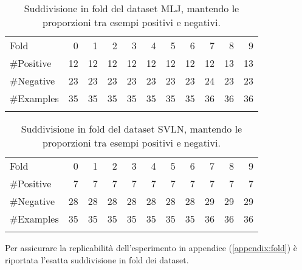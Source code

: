 \begin{table}[h!tbp]
	\centering
		\begin{tabular}{l@{\qquad}*{10}{r}}
		\toprule
\addlinespace
			Fold &  0 &  1 &  2 &  3 &  4 &  5 &  6 &  7 &  8 &  9 \\
\addlinespace
\midrule
\addlinespace
\#Positive  & 12  & 12  &  12 &  12 &  12 &  12 &  12 &  12 & 13 & 13 \\
\#Negative  & 23 & 23 & 23 & 23 & 23 & 23 & 23 & 24 & 23 & 23 \\
\#Examples  & 35 & 35 & 35 & 35 & 35 & 35 & 35 & 36 & 36 & 36 \\
\addlinespace
\bottomrule
		\end{tabular}
\caption[MLJ: suddivisione in fold.]{Suddivisione in fold del dataset MLJ, mantendo le proporzioni tra esempi positivi e negativi.}
	\label{tab:MLJ}
\end{table}

\begin{table}[h!tbp]
	\centering
		\begin{tabular}{l@{\qquad}*{10}{r}}
		\toprule
\addlinespace
			Fold &  0 &  1 &  2 &  3 &  4 &  5 &  6 &  7 &  8 &  9 \\
\addlinespace
\midrule
\addlinespace
\#Positive & 7  & 7  &  7 &  7 &  7 &  7 &  7 &  7 &  7 &  7 \\
\#Negative & 28 & 28 & 28 & 28 & 28 & 28 & 28 & 29 & 29 & 29 \\
\#Examples & 35 & 35 & 35 & 35 & 35 & 35 & 35 & 36 & 36 & 36 \\
\addlinespace
\bottomrule
		\end{tabular}
\caption[SVLN: suddivisione in fold.]{Suddivisione in fold del dataset SVLN, mantendo le proporzioni tra esempi positivi e negativi.}
	\label{tab:SVLN}
\end{table}

Per assicurare la replicabilità dell'esperimento in appendice (\ref{appendix:fold}) è riportata l'esatta suddivisione in fold dei dataset.